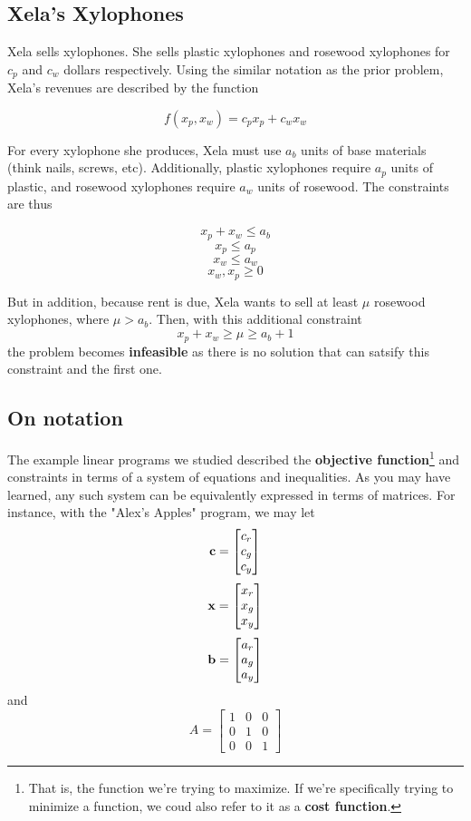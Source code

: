 \documentclass{paper}
\begin{document}
\subsection{Xela's Xylophones}

Xela sells xylophones. She sells plastic xylophones and rosewood xylophones for $c_p$ and $c_w$ dollars respectively. Using the similar notation as the prior problem, Xela's revenues are described by the function

\[ f(x_p, x_w) = c_p x_p + c_w x_w \]

\medskip For every xylophone she produces, Xela must use $a_b$ units of base materials (think nails, screws, etc). Additionally, plastic xylophones require $a_p$ units of plastic, and rosewood xylophones require $a_w$ units of rosewood. The constraints are thus

\[ x_p + x_w \leq a_b \]
\[ x_p \leq a_p \]
\[ x_w \leq a_w \]
\[ x_w, x_p \geq 0 \]

But in addition, because rent is due, Xela wants to sell at least $\mu$ rosewood xylophones, where $\mu > a_b$. Then, with this additional constraint 
\[ x_p + x_w \geq \mu \geq a_b + 1 \] the problem becomes \textbf{infeasible} as there is no solution that can satsify this constraint and the first one.

\subsection{On notation}

The example linear programs we studied described the \textbf{objective function}\footnote{That is, the function we're trying to maximize. If we're specifically trying to minimize a function, we coud also refer to it as a \textbf{cost function}.} and constraints in terms of a system of equations and inequalities. As you may have learned, any such system can be equivalently expressed in terms of matrices. For instance, with the "Alex's Apples" program, we may let 
$$\bold{c} = \begin{bmatrix}c_r \\ c_g \\ c_y \end{bmatrix}$$ 
$$\bold{x} = \begin{bmatrix}x_r \\ x_g \\ x_y \end{bmatrix}$$ 
$$\bold{b} = \begin{bmatrix}a_r \\ a_g \\ a_y \end{bmatrix}$$ and 
$$A = \begin{bmatrix}1 & 0 & 0 \\ 0 & 1 & 0 \\ 0 & 0 & 1 \end{bmatrix}$$
\end{document}
